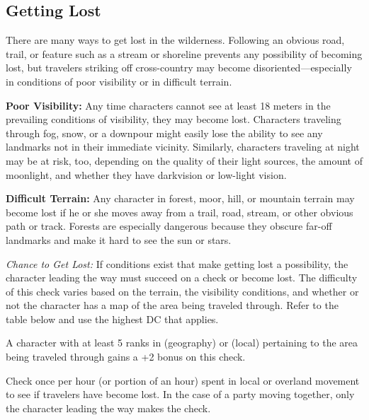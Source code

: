 \subsection{Getting Lost}
There are many ways to get lost in the wilderness. Following an obvious road, trail, or feature such as a stream or shoreline prevents any possibility of becoming lost, but travelers striking off cross-country may become disoriented---especially in conditions of poor visibility or in difficult terrain.


\textbf{Poor Visibility:} Any time characters cannot see at least 18 meters in the prevailing conditions of visibility, they may become lost. Characters traveling through fog, snow, or a downpour might easily lose the ability to see any landmarks not in their immediate vicinity. Similarly, characters traveling at night may be at risk, too, depending on the quality of their light sources, the amount of moonlight, and whether they have darkvision or low-light vision.

\textbf{Difficult Terrain:} Any character in forest, moor, hill, or mountain terrain may become lost if he or she moves away from a trail, road, stream, or other obvious path or track. Forests are especially dangerous because they obscure far-off landmarks and make it hard to see the sun or stars.

\textit{Chance to Get Lost:} If conditions exist that make getting lost a possibility, the character leading the way must succeed on a  check or become lost. The difficulty of this check varies based on the terrain, the visibility conditions, and whether or not the character has a map of the area being traveled through. Refer to the table below and use the highest DC that applies.

A character with at least 5 ranks in  (geography) or  (local) pertaining to the area being traveled through gains a +2 bonus on this check.

Check once per hour (or portion of an hour) spent in local or overland movement to see if travelers have become lost. In the case of a party moving together, only the character leading the way makes the check.

